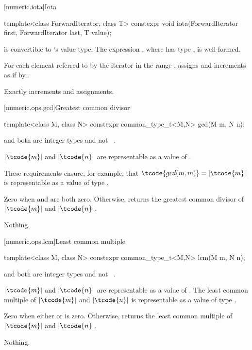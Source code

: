 [numeric.iota]{Iota}

%
\begin{itemdecl}
template<class ForwardIterator, class T>
  constexpr void iota(ForwardIterator first, ForwardIterator last, T value);
\end{itemdecl}

\begin{itemdescr}
\pnum
\mandates
{} is convertible to 's value type.
The expression , where  has type ,
is well-formed.

\pnum
\effects
For each element referred to by the iterator 
in the range ,
assigns  and increments 
as if by .

\pnum
\complexity
Exactly  increments and assignments.
\end{itemdescr}

[numeric.ops.gcd]{Greatest common divisor}

%
\begin{itemdecl}
template<class M, class N>
  constexpr common_type_t<M,N> gcd(M m, N n);
\end{itemdecl}

\begin{itemdescr}
\pnum
\mandates
{} and  both are integer types and not
\cv{}~.

\pnum
\expects
$|\tcode{m}|$ and $|\tcode{n}|$
are representable as a value of .
\begin{note}
These requirements ensure, for example,
that $\tcode{gcd(m, m)} = |\tcode{m}|$
is representable as a value of type .
\end{note}


\pnum
\returns
Zero when  and  are both zero. Otherwise,
returns the greatest common divisor of $|\tcode{m}|$ and $|\tcode{n}|$.

\pnum
\throws
Nothing.
\end{itemdescr}

[numeric.ops.lcm]{Least common multiple}

%
\begin{itemdecl}
template<class M, class N>
  constexpr common_type_t<M,N> lcm(M m, N n);
\end{itemdecl}

\begin{itemdescr}
\pnum
\mandates
{} and  both are integer types and not
\cv{}~.

\pnum
\expects
$|\tcode{m}|$ and $|\tcode{n}|$
are representable as a value of .
The least common multiple of $|\tcode{m}|$ and $|\tcode{n}|$
is representable as a value of type .


\pnum
\returns
Zero when either  or  is zero.
Otherwise, returns the least common multiple of $|\tcode{m}|$ and $|\tcode{n}|$.

\pnum
\throws
Nothing.
\end{itemdescr}

